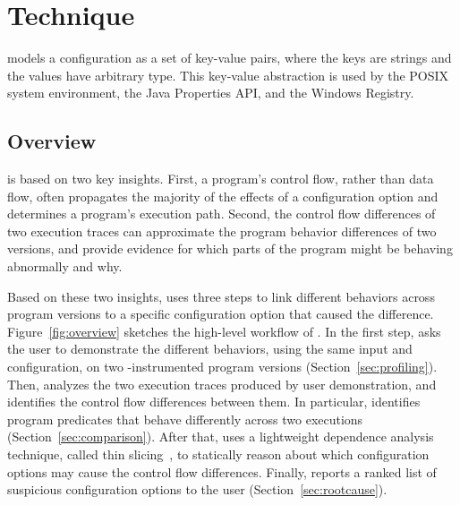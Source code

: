 
\section{Technique}
\label{sec:technique}

\ourtool models a configuration as a set of key-value
pairs, where the keys are strings and the values have
arbitrary type. 
This key-value abstraction
is used by the POSIX system environment, the Java
Properties API, and the Windows Registry.


\subsection{Overview}

\ourtool is based on two key insights. First,
a program's control flow, rather than data flow, often propagates the majority of
the effects of a configuration option and determines
a program's execution path.
Second, the control flow differences of two execution
traces can approximate the program behavior differences
of two versions, and provide evidence
for which parts of the program might be behaving
abnormally and why.

Based on these two insights, \ourtool uses three
steps to link different behaviors across program
versions to a specific configuration option that caused the difference.
Figure~\ref{fig:overview} sketches the high-level workflow of
\ourtool. 
In the first step, \ourtool asks the
user to demonstrate the different behaviors, using the same input and
configuration, on two \ourtool-instrumented program versions
(Section~\ref{sec:profiling}).
Then, \ourtool analyzes the two execution traces produced
by user demonstration, and identifies the control flow differences between
them. In particular, \ourtool identifies program predicates
that behave differently across two executions
(Section~\ref{sec:comparison}).
After that, \ourtool uses a lightweight dependence
analysis technique, called thin slicing~\cite{Sridharan:2007},
to statically reason about which configuration
options may cause the control flow differences.
Finally, \ourtool reports a ranked list of 
suspicious configuration options to the user (Section~\ref{sec:rootcause}).

